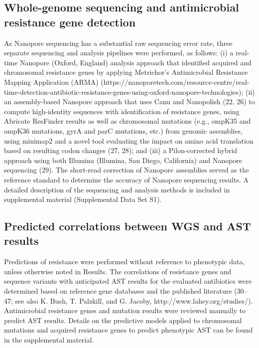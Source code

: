 \subsection{Whole-genome sequencing and antimicrobial resistance gene detection}
\label{sec:wgs}

As Nanopore sequencing has a substantial raw sequencing error rate, three separate sequencing and analysis pipelines were performed, as follows: (i) a real-time Nanopore (Oxford, England) analysis approach that identified acquired and chromosomal resistance genes by applying Metrichor’s Antimicrobial Resistance Mapping Application (ARMA) (https://nanoporetech.com/resource-centre/real-time-detection-antibiotic-resistance-genes-using-oxford-nanopore-technologies); (ii) an assembly-based Nanopore approach that uses Canu and Nanopolish (22, 26) to compute high-identity sequences with identification of resistance genes, using Abricate ResFinder results as well as chromosomal mutations (e.g., ompK35 and ompK36 mutations, gyrA and parC mutations, etc.) from genomic assemblies, using minimap2 and a novel tool evaluating the impact on amino acid translation based on resulting codon changes (27, 28); and (iii) a Pilon-corrected hybrid approach using both Illumina (Illumina, San Diego, California) and Nanopore sequencing (29). The short-read correction of Nanopore assemblies served as the reference standard to determine the accuracy of Nanopore sequencing results. A detailed description of the sequencing and analysis methods is included in supplemental material (Supplemental Data Set S1).

\subsection{Predicted correlations between WGS and AST results}
\label{sec:wgsast}

Predictions of resistance were performed without reference to phenotypic data, unless otherwise noted in Results. The correlations of resistance genes and sequence variants with anticipated AST results for the evaluated antibiotics were determined based on reference gene databases and the published literature (30–47; see also K. Bush, T. Palzkill, and G. Jacoby, http://www.lahey.org/studies/). Antimicrobial resistance genes and mutation results were reviewed manually to predict AST results. Details on the predictive models applied to chromosomal mutations and acquired resistance genes to predict phenotypic AST can be found in the supplemental material.

